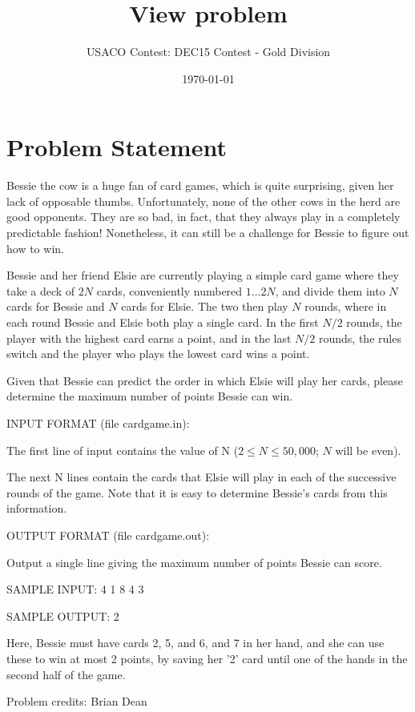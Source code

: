 \documentclass[12pt]{article}
\title{View problem}
\author{USACO Contest: DEC15 Contest - Gold Division}
\date{\today}
\begin{document}
\maketitle

\section*{Problem Statement}

Bessie the cow is a huge fan of card games, which is quite surprising, given her
lack of opposable thumbs.  Unfortunately, none of the other cows in the herd are
good opponents.  They are so bad, in fact, that they always play in a completely
predictable fashion!  Nonetheless, it can still be a challenge for Bessie to
figure out how to win.

Bessie and her friend Elsie are currently playing a simple card game where they
take a deck of $2N$ cards, conveniently numbered $1 \ldots 2N$, and divide them
into $N$ cards for Bessie and $N$ cards for Elsie.   The two then play $N$
rounds, where in each round Bessie and Elsie both play a single card.  In the
first $N/2$ rounds, the player with the highest card earns a point, and in the
last $N/2$ rounds, the rules switch and the player who plays the lowest card
wins a point.

Given that Bessie can predict the order in which Elsie will play her cards,
please determine the maximum number of points Bessie can win.

INPUT FORMAT (file cardgame.in):

The first line of input contains the value of N ($2 \leq N \leq 50,000$; $N$
will be even).

The next N lines contain the cards that Elsie will play in each of the
successive rounds of the game.  Note that it is easy to determine Bessie's cards
from this information.


OUTPUT FORMAT (file cardgame.out):

Output a single line giving the maximum number of points Bessie can score.


SAMPLE INPUT:
4
1
8
4
3

SAMPLE OUTPUT: 
2

Here, Bessie must have cards 2, 5, and 6, and 7 in her hand, and
she can use these to win at most 2 points, by saving her '2' card until one
of the hands in the second half of the game.

Problem credits: Brian Dean
\end{document}
